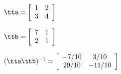 {$\tta = \left[
\begin{array}{cc}
 1 & 2 \\
 3 & 4
\end{array}\right]$

$\ttb = \left[
\begin{array}{cc}
 7 & 1 \\
 2 & 1
\end{array}
\right]$}
{$(\tta\ttb)^{-1} = \left[
\begin{array}{cc}
-7/10 & 3/10 \\
29/10 & -11/10
 \end{array}
\right]$}

